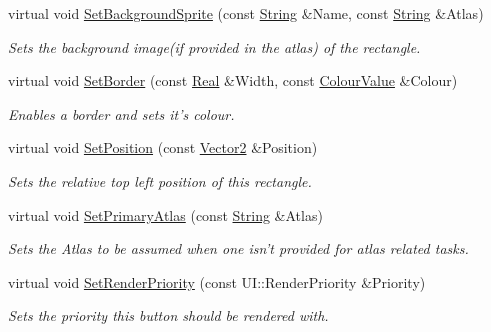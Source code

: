 \begin{DoxyCompactItemize}
virtual void \hyperlink{classphys_1_1UI_1_1Rectangle_aa20172e511e24ed24e21e0bdac0e00c4}{SetBackgroundSprite} (const \hyperlink{namespacephys_aa03900411993de7fbfec4789bc1d392e}{String} \&Name, const \hyperlink{namespacephys_aa03900411993de7fbfec4789bc1d392e}{String} \&Atlas)
\begin{DoxyCompactList}\small\item\em Sets the background image(if provided in the atlas) of the rectangle. \item\end{DoxyCompactList}\item 
virtual void \hyperlink{classphys_1_1UI_1_1Rectangle_aaea6f9d5cd62b63a132c03c894a6d8de}{SetBorder} (const \hyperlink{namespacephys_af7eb897198d265b8e868f45240230d5f}{Real} \&Width, const \hyperlink{classphys_1_1ColourValue}{ColourValue} \&Colour)
\begin{DoxyCompactList}\small\item\em Enables a border and sets it's colour. \item\end{DoxyCompactList}\item 
virtual void \hyperlink{classphys_1_1UI_1_1Rectangle_a16fd918d53d0ae1f82af2574c0396b2c}{SetPosition} (const \hyperlink{classphys_1_1Vector2}{Vector2} \&Position)
\begin{DoxyCompactList}\small\item\em Sets the relative top left position of this rectangle. \item\end{DoxyCompactList}\item 
virtual void \hyperlink{classphys_1_1UI_1_1Rectangle_a275a1495bdbb3829b5f94525d6caa9ed}{SetPrimaryAtlas} (const \hyperlink{namespacephys_aa03900411993de7fbfec4789bc1d392e}{String} \&Atlas)
\begin{DoxyCompactList}\small\item\em Sets the Atlas to be assumed when one isn't provided for atlas related tasks. \item\end{DoxyCompactList}\item 
virtual void \hyperlink{classphys_1_1UI_1_1Rectangle_a79a98cac2cdd05d6ea6fa3865c9c4b6e}{SetRenderPriority} (const UI::RenderPriority \&Priority)
\begin{DoxyCompactList}\small\item\em Sets the priority this button should be rendered with. \item\end{DoxyCompactList}\item 

\end{DoxyCompactItemize}
